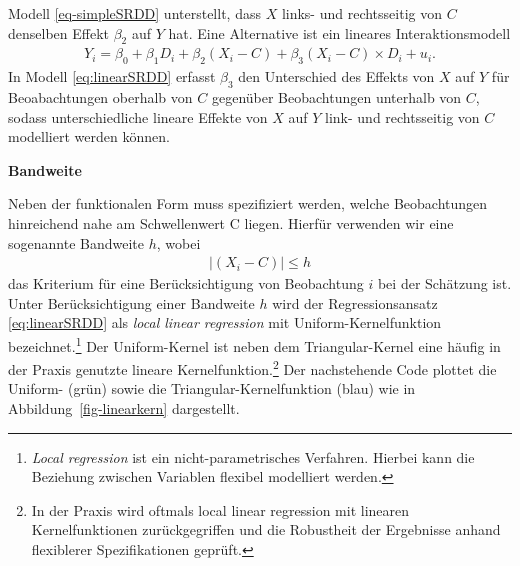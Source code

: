 \documentclass[
  letterpaper,
  DIV=11,
  oneside]{scrreprt}
\begin{document}
Modell \eqref{eq-simpleSRDD} unterstellt, dass \(X\) links- und
rechtsseitig von \(C\) denselben Effekt \(\beta_2\) auf \(Y\) hat. Eine
Alternative ist ein lineares Interaktionsmodell \begin{align}
Y_i = \beta_0 + \beta_1 D_i + \beta_2 (X_i - C) + \beta_3(X_i-C)\times D_i + u_i.\label{eq:linearSRDD}
\end{align} In Modell \eqref{eq:linearSRDD} erfasst \(\beta_3\) den
Unterschied des Effekts von \(X\) auf \(Y\) für Beoabachtungen oberhalb
von \(C\) gegenüber Beobachtungen unterhalb von \(C\), sodass
unterschiedliche lineare Effekte von \(X\) auf \(Y\) link- und
rechtsseitig von \(C\) modelliert werden können.

\textbf{Bandweite}

Neben der funktionalen Form muss spezifiziert werden, welche
Beobachtungen hinreichend nahe am Schwellenwert C liegen. Hierfür
verwenden wir eine sogenannte Bandweite \(h\), wobei \begin{align}
  \lvert(X_i-C)\rvert\leq h \label{eq:bwc}
\end{align} das Kriterium für eine Berücksichtigung von Beobachtung
\(i\) bei der Schätzung ist. Unter Berücksichtigung einer Bandweite
\(h\) wird der Regressionsansatz \eqref{eq:linearSRDD} als \emph{local
linear regression} mit Uniform-Kernelfunktion bezeichnet.\footnote{\emph{Local
  regression} ist ein nicht-parametrisches Verfahren. Hierbei kann die
  Beziehung zwischen Variablen flexibel modelliert werden.} Der
Uniform-Kernel ist neben dem Triangular-Kernel eine häufig in der Praxis
genutzte lineare Kernelfunktion.\footnote{In der Praxis wird oftmals
  local linear regression mit linearen Kernelfunktionen zurückgegriffen
  und die Robustheit der Ergebnisse anhand flexiblerer Spezifikationen
  geprüft.} Der nachstehende Code plottet die Uniform- (grün) sowie die
Triangular-Kernelfunktion (blau) wie in Abbildung~\ref{fig-linearkern}
dargestellt.
\end{document}
